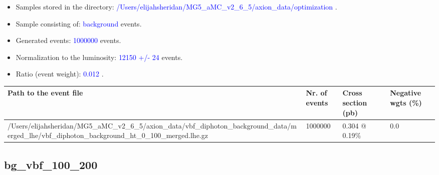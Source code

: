 \documentclass[a4paper, 10pt]{article}
\begin{document}
\begin{itemize}
  \item Samples stored in the directory: \textcolor{blue}{/\-Users/\-elijahsheridan/\-MG5\_aMC\_v2\_6\_5/\-axion\_data/\-optimization} .
   \item Sample consisting of: \textcolor{blue}{background}  events.
   \item Generated events: \textcolor{blue}{1000000 }  events.
   \item Normalization to the luminosity: \textcolor{blue}{12150}\textcolor{blue}{ +/\-- }\textcolor{blue}{24 }  events.
   \item Ratio (event weight): \textcolor{blue}{0.012 } .  
 
\end{itemize}
\begin{table}[H]
  \begin{center}
    \begin{tabular}{|m{55.0mm}|m{25.0mm}|m{30.0mm}|m{30.0mm}|}
      \hline
      {\cellcolor{yellow}         Path to the event file}& {\cellcolor{yellow}         Nr. of events}& {\cellcolor{yellow}         Cross section (pb)}& {\cellcolor{yellow}         Negative wgts (\%)}\\
      \hline
      {\cellcolor{white}          /\-Users/\-elijahsheridan/\-MG5\_aMC\_v2\_6\_5/\-axion\_data/\-vbf\_diphoton\_background\_data/\-merged\_lhe/\-vbf\_diphoton\_background\_ht\_0\_100\_merged.lhe.gz}& {\cellcolor{white}          1000000}& {\cellcolor{white}          0.304 @ 0.19\%}& {\cellcolor{white}          0.0}\\
\hline
    \end{tabular}
  \end{center}
\end{table}

\subsection{ bg\_vbf\_100\_200}
\end{document}

